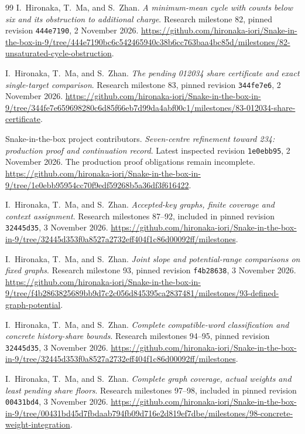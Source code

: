 \documentclass[11pt,a4paper]{article}
\theoremstyle{definition}
\theoremstyle{remark}
\begin{document}
\begin{thebibliography}{99}
I.~Hironaka, T.~Ma, and S.~Zhan. \emph{A minimum-mean cycle with counts below six and its obstruction to additional charge}. Research milestone 82, pinned revision \texttt{444e7190}, 2 November 2026.
\url{https://github.com/hironaka-iori/Snake-in-the-box-in-9/tree/444e7190bc6c542465940c38b6cc763baa4bc85d/milestones/82-unsaturated-cycle-obstruction}.

I.~Hironaka, T.~Ma, and S.~Zhan. \emph{The pending 012034 share certificate and exact single-target comparison}. Research milestone 83, pinned revision \texttt{344fe7e6}, 2 November 2026.
\url{https://github.com/hironaka-iori/Snake-in-the-box-in-9/tree/344fe7e659698280c6d85f66eb7d99da4abf00c1/milestones/83-012034-share-certificate}.

Snake-in-the-box project contributors. \emph{Seven-centre refinement toward 234: production proof and continuation record}. Latest inspected revision \texttt{1e0ebb95}, 2 November 2026. The production proof obligations remain incomplete.
\url{https://github.com/hironaka-iori/Snake-in-the-box-in-9/tree/1e0ebb95954cc70f9edf59268b5a36df3f616422}.

I.~Hironaka, T.~Ma, and S.~Zhan. \emph{Accepted-key graphs, finite coverage and context assignment}. Research milestones 87--92, included in pinned revision \texttt{32445d35}, 3 November 2026.
\url{https://github.com/hironaka-iori/Snake-in-the-box-in-9/tree/32445d353f0a8527a2732eff404f1c86d00092ff/milestones}.

I.~Hironaka, T.~Ma, and S.~Zhan. \emph{Joint slope and potential-range comparisons on fixed graphs}. Research milestone 93, pinned revision \texttt{f4b28638}, 3 November 2026.
\url{https://github.com/hironaka-iori/Snake-in-the-box-in-9/tree/f4b2863825689bb9d7c2c056d845395ca2837481/milestones/93-defined-graph-potential}.

I.~Hironaka, T.~Ma, and S.~Zhan. \emph{Complete compatible-word classification and concrete history-share bounds}. Research milestones 94--95, pinned revision \texttt{32445d35}, 3 November 2026.
\url{https://github.com/hironaka-iori/Snake-in-the-box-in-9/tree/32445d353f0a8527a2732eff404f1c86d00092ff/milestones}.

I.~Hironaka, T.~Ma, and S.~Zhan. \emph{Complete graph coverage, actual weights and least pending share floors}. Research milestones 97--98, included in pinned revision \texttt{00431bd4}, 3 November 2026.
\url{https://github.com/hironaka-iori/Snake-in-the-box-in-9/tree/00431bd45d7fbdaab794fb09d716e2d819ef7dbe/milestones/98-concrete-weight-integration}.


\end{thebibliography}
\end{document}

